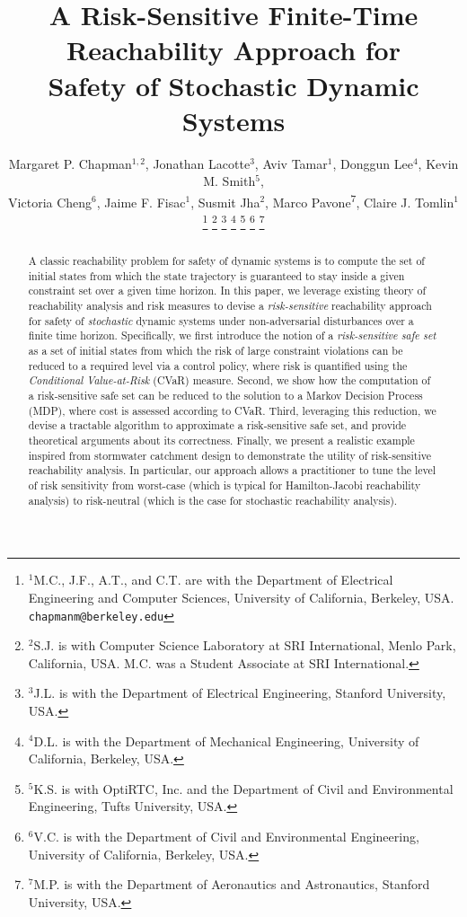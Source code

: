 \documentclass[letterpaper, 10 pt, conference]{ieeeconf}  %
\title{\LARGE \bf
A Risk-Sensitive Finite-Time Reachability Approach for \\Safety of Stochastic Dynamic Systems}
\author{Margaret P. Chapman$^{1,2}$, Jonathan Lacotte$^{3}$, Aviv Tamar$^{1}$, Donggun Lee$^{4}$,
Kevin M. Smith$^{5}$,\\ Victoria Cheng$^{6}$, Jaime F. Fisac$^{1}$, Susmit Jha$^{2}$, Marco Pavone\textsuperscript{7}, Claire J. Tomlin$^{1}$%
\thanks{$^{1}$M.C., J.F., A.T., and C.T. are with the Department of Electrical Engineering and Computer Sciences, University of California, Berkeley, USA.
        {\tt\small chapmanm@berkeley.edu}}%
\thanks{$^{2}$S.J. is with Computer Science Laboratory at SRI International, Menlo Park, California, USA. M.C. was a Student Associate at SRI International.
        }%
\thanks{$^{3}$J.L. is with the Department of Electrical Engineering, Stanford University, USA.
        }%
\thanks{$^{4}$D.L. is with the Department of Mechanical Engineering, University of California, Berkeley, USA.
        }%
\thanks{$^{5}$K.S. is with OptiRTC, Inc. and the Department of Civil and Environmental Engineering, Tufts University, USA.
        }%
\thanks{$^{6}$V.C. is with the Department of Civil and Environmental Engineering, University of California, Berkeley, USA.
        }%
        \thanks{$^{7}$M.P. is with the Department of Aeronautics and Astronautics, Stanford University, USA.
        }%
}
\begin{document}
\maketitle

\thispagestyle{empty}
\pagestyle{empty}

\begin{abstract}
A classic reachability problem for safety of dynamic systems is to compute the set of initial states from which 
the state trajectory is guaranteed to stay inside a given constraint set over a given time horizon. 
In this paper, we leverage existing theory of reachability analysis and risk measures to devise a \textit{risk-sensitive} reachability approach for safety of {\em stochastic} dynamic systems under non-adversarial disturbances
over a finite time horizon. Specifically, we first introduce the notion of a \textit{risk-sensitive safe set} as a set of initial states from which 
the risk of large constraint violations can be reduced to a required level via a control policy, where risk is quantified 
using the \textit{Conditional Value-at-Risk} (CVaR) measure. Second, we show how the computation of a risk-sensitive safe set can be reduced to the 
solution to a Markov Decision Process (MDP), where cost is assessed according to CVaR. 
Third, leveraging this reduction, we devise a tractable algorithm to approximate a risk-sensitive safe set, 
and provide theoretical arguments about its correctness. 
Finally, we present a realistic
example inspired from stormwater catchment design to demonstrate the utility of risk-sensitive reachability analysis.
In particular, our approach allows a practitioner to tune the level of risk sensitivity from worst-case 
(which is typical for Hamilton-Jacobi reachability analysis) to risk-neutral 
(which is the case for stochastic reachability analysis). %
\end{abstract}
\end{document}
